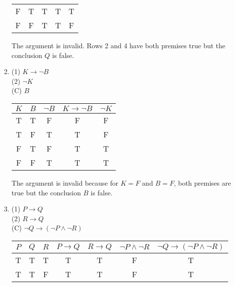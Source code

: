 \documentclass{article}
\begin{document}
\begin{enumerate}
\begin{center}
\begin{tabular}{c|c|c|c|c}
                        F   & T   & T                 & T              & T   \\
                        F   & F   & T                 & T              & F   \\
                  \end{tabular}
            \end{center}
            The argument is invalid. Rows 2 and 4 have both premises true but the conclusion $Q$ is false.
      \item (1) $K\to\neg B$ \\
            (2) $\neg K$\\
            (C) $B$\\
            \begin{center}
                  \begin{tabular}{c|c|c|c|c}
                        $K$ & $B$ & $\neg B$ & $K\to\neg B$ & $\neg K$ \\
                        \hline
                        T   & T   & F        & F            & F        \\
                        T   & F   & T        & T            & F        \\
                        F   & T   & F        & T            & T        \\
                        F   & F   & T        & T            & T        \\
                  \end{tabular}
            \end{center}
            The argument is invalid because for $K=F$ and $B=F$, both premises are true but the conclusion $B$ is false.
      \item (1) $P \to Q$\\
            (2) $R \to Q$\\
            (C) $\neg Q \to (\neg P \land \neg R)$\\
            \begin{center}
                  \begin{tabular}{c|c|c|c|c|c|c}
                        $P$ & $Q$ & $R$ & $P \to Q$ & $R \to Q$ & $\neg P \land \neg R$ & $\neg Q \to (\neg P \land \neg R)$ \\
                        \hline
                        T   & T   & T   & T         & T         & F                     & T                                  \\
                        T   & T   & F   & T         & T         & F                     & T                                  \\

\end{tabular}
\end{center}
\end{enumerate}
\end{document}
